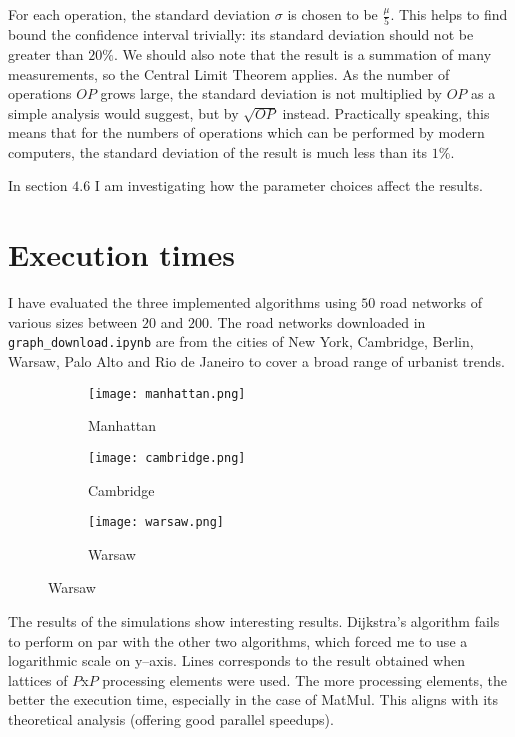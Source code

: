 \documentclass[12pt,a4paper,oneside,openright]{report}
\begin{document}
For each operation, the standard deviation $\sigma$ is chosen to be $\frac{\mu}{5}$. This helps to find bound the confidence interval trivially: its standard deviation should not be greater than $20\%$. We should also note that the result is a summation of many measurements, so the Central Limit Theorem \cite{central} applies. As the number of operations $OP$ grows large, the standard deviation is not multiplied by $OP$ as a simple analysis would suggest, but by $\sqrt{OP}$ instead. Practically speaking, this means that for the numbers of operations which can be performed by modern computers, the standard deviation of the result is much less than its $1\%$. 

In section $4.6$ I am investigating how the parameter choices affect the results. 

\section{Execution times}
I have evaluated the three implemented algorithms using $50$ road networks of various sizes between $20$ and $200$. The road networks downloaded in \texttt{graph\_download.ipynb} are from the cities of New York, Cambridge, Berlin, Warsaw, Palo Alto and Rio de Janeiro to cover a broad range of urbanist trends.

\begin{figure}[h]
\caption{Comparison of various road networks}
  \begin{subfigure}{5.2cm}
    \centering\texttt{[image: manhattan.png]}
    \caption{Manhattan}
  \end{subfigure}
  \begin{subfigure}{5.2cm}
    \centering\texttt{[image: cambridge.png]}
    \caption{Cambridge}
  \end{subfigure}
  \begin{subfigure}{5.2cm}
    \centering\texttt{[image: warsaw.png]}
    \caption{Warsaw}
  \end{subfigure}
\end{figure}

The results of the simulations show interesting results. Dijkstra's algorithm fails to perform on par with the other two algorithms, which forced me to use a logarithmic scale on y--axis. Lines corresponds to the result obtained when lattices of $P$x$P$ processing elements were used. The more processing elements, the better the execution time, especially in the case of MatMul. This aligns with its theoretical analysis (offering good parallel speedups). 
\end{document}
